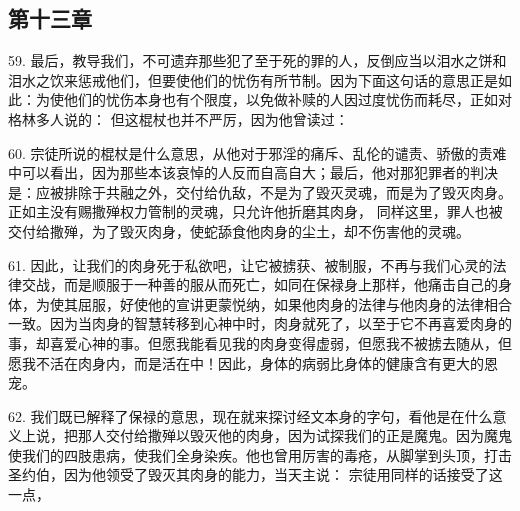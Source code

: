 
\subsection{第十三章}

\par

59. 最后，教导我们，不可遗弃那些犯了至于死的罪的人，反倒应当以泪水之饼和泪水之饮来惩戒他们，但要使他们的忧伤有所节制。因为下面这句话的意思正是如此：为使他们的忧伤本身也有个限度，以免做补赎的人因过度忧伤而耗尽，正如对格林多人说的： 但这棍杖也并不严厉，因为他曾读过：\par

60. 宗徒所说的棍杖是什么意思，从他对于邪淫的痛斥、乱伦的谴责、骄傲的责难中可以看出，因为那些本该哀悼的人反而自高自大；最后，他对那犯罪者的判决是：应被排除于共融之外，交付给仇敌，不是为了毁灭灵魂，而是为了毁灭肉身。正如主没有赐撒殚权力管制的灵魂，只允许他折磨其肉身， 同样这里，罪人也被交付给撒殚，为了毁灭肉身，使蛇舔食他肉身的尘土，却不伤害他的灵魂。\par

61. 因此，让我们的肉身死于私欲吧，让它被掳获、被制服，不再与我们心灵的法律交战，而是顺服于一种善的服从而死亡，如同在保禄身上那样，他痛击自己的身体，为使其屈服，好使他的宣讲更蒙悦纳，如果他肉身的法律与他肉身的法律相合一致。因为当肉身的智慧转移到心神中时，肉身就死了，以至于它不再喜爱肉身的事，却喜爱心神的事。但愿我能看见我的肉身变得虚弱，但愿我不被掳去随从，但愿我不活在肉身内，而是活在中！因此，身体的病弱比身体的健康含有更大的恩宠。\par

62. 我们既已解释了保禄的意思，现在就来探讨经文本身的字句，看他是在什么意义上说，把那人交付给撒殚以毁灭他的肉身，因为试探我们的正是魔鬼。因为魔鬼使我们的四肢患病，使我们全身染疾。他也曾用厉害的毒疮，从脚掌到头顶，打击圣约伯，因为他领受了毁灭其肉身的能力，当天主说： 宗徒用同样的话接受了这一点，\par

